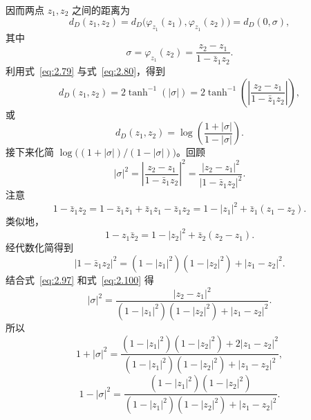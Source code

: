 因而两点 $z_1,z_2$ 之间的距离为
\begin{equation*}
  d_D(z_1,z_2)=d_D\bigl(\varphi_{z_1}(z_1),\varphi_{z_1}(z_2)\bigr)=d_D(0,\sigma),
  \tag{2.93}\label{eq:2.93}
\end{equation*}
其中
\begin{equation*}
  \sigma=\varphi_{z_1}(z_2)=\frac{z_2-z_1}{1-\bar z_1z_2}.
  \tag{2.94}\label{eq:2.94}
\end{equation*}
利用式~\eqref{eq:2.79} 与式~\eqref{eq:2.80}，得到
\begin{equation*}
  d_D(z_1,z_2)=2\tanh^{-1}(|\sigma|)
      =2\tanh^{-1}\!\left(\left|\frac{z_2-z_1}{1-\bar z_1z_2}\right|\right),
  \tag{2.95}\label{eq:2.95}
\end{equation*}
或
\begin{equation*}
  d_D(z_1,z_2)=\log\!\left(\frac{1+|\sigma|}{1-|\sigma|}\right).
  \tag{2.96}\label{eq:2.96}
\end{equation*}
接下来化简 $\log\bigl((1+|\sigma|)/(1-|\sigma|)\bigr)$。回顾
\begin{equation*}
  |\sigma|^2=\left|\frac{z_2-z_1}{1-\bar z_1z_2}\right|^2
     =\frac{|z_2-z_1|^2}{|1-\bar z_1z_2|^2}.
  \tag{2.97}\label{eq:2.97}
\end{equation*}
注意
\begin{equation*}
  1-\bar z_1z_2=1-\bar z_1z_1+\bar z_1z_1-\bar z_1z_2
     =1-|z_1|^2+\bar z_1(z_1-z_2).
  \tag{2.98}\label{eq:2.98}
\end{equation*}
类似地，
\begin{equation*}
  1-z_1\bar z_2=1-|z_2|^2+\bar z_2(z_2-z_1).
  \tag{2.99}\label{eq:2.99}
\end{equation*}
经代数化简得到
\begin{equation*}
  |1-\bar z_1z_2|^2=(1-|z_1|^2)(1-|z_2|^2)+|z_1-z_2|^2.
  \tag{2.100}\label{eq:2.100}
\end{equation*}
结合式~\eqref{eq:2.97} 和式~\eqref{eq:2.100} 得
\begin{equation*}
  |\sigma|^2=\frac{|z_2-z_1|^2}{(1-|z_1|^2)(1-|z_2|^2)+|z_1-z_2|^2}.
  \tag{2.101}\label{eq:2.101}
\end{equation*}
所以
\begin{equation*}
  1+|\sigma|^2=\frac{(1-|z_1|^2)(1-|z_2|^2)+2|z_1-z_2|^2}
                     {(1-|z_1|^2)(1-|z_2|^2)+|z_1-z_2|^2},
  \tag{2.102}\label{eq:2.102}
\end{equation*}
\begin{equation*}
  1-|\sigma|^2=\frac{(1-|z_1|^2)(1-|z_2|^2)}
                     {(1-|z_1|^2)(1-|z_2|^2)+|z_1-z_2|^2}.
  \tag{2.103}\label{eq:2.103}
\end{equation*}

